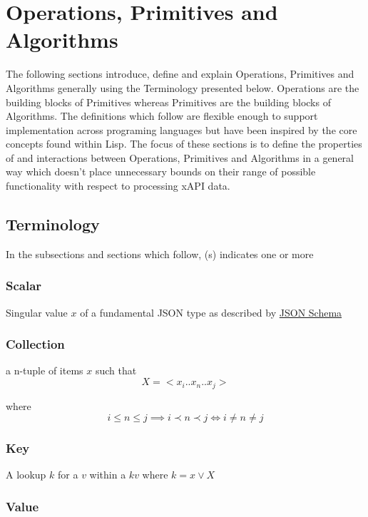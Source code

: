\documentclass[../main.tex]{subfiles}
\begin{document}
\section{Operations, Primitives and Algorithms}
The following sections introduce, define and explain Operations, Primitives and Algorithms generally using the Terminology presented below. Operations are the building blocks of Primitives whereas Primitives are the building blocks of Algorithms. The definitions which follow are flexible enough to support implementation across programing languages but have been inspired by the core concepts found within Lisp. The focus of these sections is to define the properties of and interactions between Operations, Primitives and Algorithms in a general way which doesn't place unnecessary bounds on their range of possible functionality with respect to processing xAPI data.

\subsection{Terminology}

In the subsections and sections which follow, (s) indicates one or more

\subsubsection{Scalar}

Singular value $x$ of a fundamental JSON type as described by \href{https://json-schema.org/understanding-json-schema/reference/type.html}{JSON Schema}

\subsubsection{Collection}

a n-tuple of items $x$ such that
$$X = <x_{i}..x_{n}..x_{j}>$$

where
$$i \leq n \leq j \implies i \prec n \prec j \iff i \not= n \not= j$$

\subsubsection{Key}

A lookup $k$ for a $v$ within a $kv$ where $k = x \lor X$

\subsubsection{Value}
\end{document}
